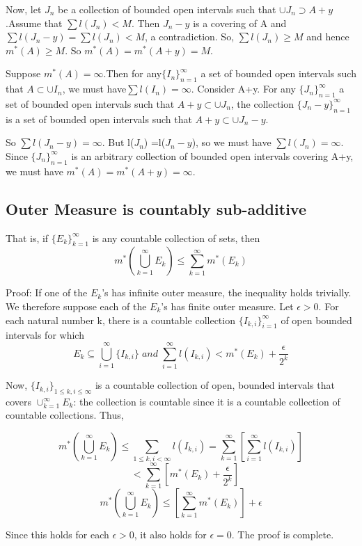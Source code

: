 \documentclass{article}
\begin{document}
Now, let ${J_n}$ be a collection of bounded open intervals such that $\cup J_n \supset A+y $.Assume that $\sum l(J_n)< M$. Then ${J_n-y}$ is a covering of A and $\sum l(J_n-y)=\sum l(J_n) < M$, a contradiction. So, $\sum l(J_n) \geq M$ and hence $m^*(A)\geq M$. So $m^*(A)=m^*(A+y)=M$.\medskip

Suppose $m^*(A)= \infty$.Then for any$\{I_n\}_{n=1}^{\infty} $ a set of bounded open intervals such that $A \subset \cup I_n$, we must
have$\sum l(I_n) =\infty$. Consider A+y. For any $\{J_n\}_{n=1}^{\infty} $ a set of bounded open intervals such that $A+y \subset \cup J_n$, the collection $\{J_n - y\}_{n=1}^{\infty} $ is a set of bounded open intervals such that $A+y \subset \cup J_n -y$. \smallskip

So $\sum l(J_n - y) =\infty$. But l($J_n$) =l($J_n - y$), so we must have $\sum l(J_n) =\infty$. Since $\{J_n\}_{n=1}^{\infty} $ is an arbitrary collection of bounded open intervals covering A+y, we must have $m^*(A)=m^*(A+y)= \infty$. 

\subsection{Outer Measure is countably sub-additive}

That is, if $\{E_k\}_{k=1}^{\infty} $ is any countable collection of sets, then
$$ m^*(\bigcup_{k=1}^{\infty} E_k) \leq \sum_{k=1}^{\infty} m^{*}(E_k)$$

Proof: If one of the $E_k$'s has infinite outer measure, the inequality holds trivially. We therefore suppose each of the $E_k$'s has finite outer measure. Let $\epsilon > 0$. For each natural number k, there is a countable collection $\{ I_{k,i} \}_{i=1}^{\infty}$ of open bounded intervals for which
$$ E_k \subseteq \bigcup_{i=1}^{\infty} \{ I_{k,i} \} \; and \; \sum_{i=1}^{\infty} l(I_{k,i}) < m^{*}(E_k) +\frac{\epsilon}{2^k}  $$

Now, $\{I_{k,i}\}_{1 \leq k , i \leq \infty}$ is a countable collection of open, bounded intervals that covers $\cup_{k=1}^{\infty} E_k$: the collection is countable since it is a countable collection of countable collections. Thus,

$$ m^{*}(\bigcup_{k=1}^{\infty} E_k) \leq \sum_{1\leq k,i<\infty } l(I_{k,i})= \sum_{k=1}^{\infty}[\sum_{i=1}^{\infty} l(I_{k,i})]$$
$$\;\;\;<\sum_{k=1}^{\infty}[m^{*}(E_k) + \frac{\epsilon}{2^k}]$$
$$  m^{*}(\bigcup_{k=1}^{\infty} E_k) \leq [\sum_{k=1}^{\infty}m^{*}(E_k)]+\epsilon$$

Since this holds for each $\epsilon>0$, it also holds for $\epsilon=0$. The proof is complete.
\end{document}

